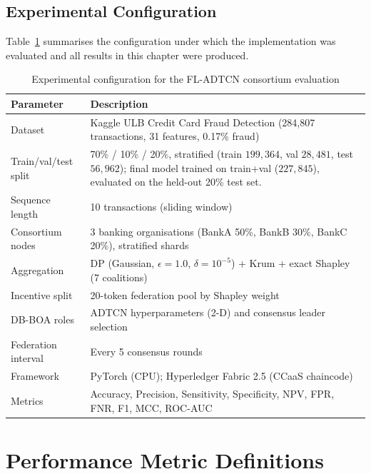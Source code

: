 \subsection*{Experimental Configuration}

Table~\ref{tab:fl_adtcn_config} summarises the configuration under which the implementation was evaluated and all results in this chapter were produced.

\begin{table}[H]
\centering
\caption{Experimental configuration for the FL-ADTCN consortium evaluation}
\label{tab:fl_adtcn_config}
\begin{tabular}{|p{3.8cm}|p{10.0cm}|}
\hline
\textbf{Parameter} & \textbf{Description} \\ \hline
Dataset & Kaggle ULB Credit Card Fraud Detection (284,807 transactions, 31 features, 0.17\% fraud) \\ \hline
Train/val/test split & 70\% / 10\% / 20\%, stratified (train $199{,}364$, val $28{,}481$, test $56{,}962$); final model trained on train+val ($227{,}845$), evaluated on the held-out 20\% test set. \\ \hline
Sequence length & 10 transactions (sliding window) \\ \hline
Consortium nodes & 3 banking organisations (BankA 50\%, BankB 30\%, BankC 20\%), stratified shards \\ \hline
Aggregation & DP (Gaussian, $\epsilon=1.0$, $\delta=10^{-5}$) + Krum + exact Shapley (7 coalitions) \\ \hline
Incentive split & 20-token federation pool by Shapley weight \\ \hline
DB-BOA roles & ADTCN hyperparameters (2-D) and consensus leader selection \\ \hline
Federation interval & Every 5 consensus rounds \\ \hline
Framework & PyTorch (CPU); Hyperledger Fabric 2.5 (CCaaS chaincode) \\ \hline
Metrics & Accuracy, Precision, Sensitivity, Specificity, NPV, FPR, FNR, F1, MCC, ROC-AUC \\ \hline
\end{tabular}
\end{table}

\FloatBarrier

\section{Performance Metric Definitions}
\label{sec:metric-defs}

